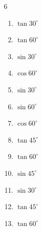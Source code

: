\begin{multicols}{6}
\begin{enumerate}
  \item $\displaystyle \tan{30^\circ}$


  \item $\displaystyle \tan{60^\circ}$


  \item $\displaystyle \sin{30^\circ}$


  \item $\displaystyle \cos{60^\circ}$


\columnbreak %

  \item $\displaystyle \sin{30^\circ}$


  \item $\displaystyle \sin{60^\circ}$


  \item $\displaystyle \cos{60^\circ}$


  \item $\displaystyle \tan{45^\circ}$

        \phantom{$\displaystyle =1$}

  \item $\displaystyle \tan{60^\circ}$


  \item $\displaystyle \sin{45^\circ}$


  \item $\displaystyle \sin{30^\circ}$


  \item $\displaystyle \tan{45^\circ}$

        \phantom{$\displaystyle =1$}

  \item $\displaystyle \tan{60^\circ}$


\end{enumerate}
\end{multicols}
